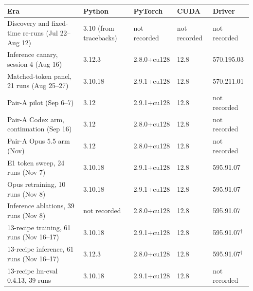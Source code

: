 \begin{tabular}{p{2.1in}llll}
\toprule
Era & Python & PyTorch & CUDA & Driver \\
\midrule
Discovery and fixed-time re-runs (Jul 22--Aug 12) & 3.10 (from tracebacks) & not recorded & not recorded & not recorded \\
Inference canary, session 4 (Aug 16) & 3.12.3 & 2.8.0+cu128 & 12.8 & 570.195.03 \\
Matched-token panel, 21 runs (Aug 25--27) & 3.10.18 & 2.9.1+cu128 & 12.8 & 570.211.01 \\
Pair-A pilot (Sep 6--7) & 3.12 & 2.9.1+cu128 & 12.8 & not recorded \\
Pair-A Codex arm, continuation (Sep 16) & 3.12 & 2.8.0+cu128 & 12.8 & not recorded \\
Pair-A Opus 5.5 arm (Nov) & 3.12 & 2.8.0+cu128 & 12.8 & not recorded \\
E1 token sweep, 24 runs (Nov 7) & 3.10.18 & 2.9.1+cu128 & 12.8 & 595.91.07 \\
Opus retraining, 10 runs (Nov 8) & 3.10.18 & 2.9.1+cu128 & 12.8 & 595.91.07 \\
Inference ablations, 39 runs (Nov 8) & not recorded & 2.8.0+cu128 & 12.8 & 595.91.07 \\
13-recipe training, 61 runs (Nov 16--17) & 3.10.18 & 2.9.1+cu128 & 12.8 & 595.91.07$^\dagger$ \\
13-recipe inference, 61 runs (Nov 16--17) & 3.12.3 & 2.8.0+cu128 & 12.8 & 595.91.07$^\dagger$ \\
13-recipe lm-eval 0.4.13, 39 runs & 3.10.18 & 2.9.1+cu128 & 12.8 & not recorded \\
\bottomrule
\end{tabular}
